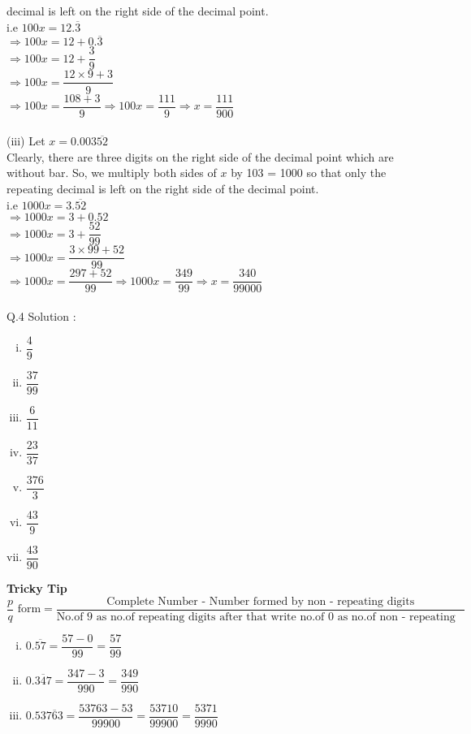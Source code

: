 decimal is left on the right
side of the decimal point.\\
i.e $100x = 12.\overline{3}$\\
$\Rightarrow 100x = 12+0.\overline{3}$\\  
$\Rightarrow 100x = 12+\dfrac{3}{9}$\\
$\Rightarrow 100x = \dfrac{12\times9+3}{9}$\\
$\Rightarrow 100x = \dfrac{108+3}{9} \Rightarrow 100x = \dfrac{111}{9}
\Rightarrow x = \dfrac{111}{900}$\\\\
(iii) Let $x = 0.003\overline{52}$\\
Clearly, there are three digits on the right side of the decimal point
which are without bar. So,
we multiply both sides of $x$ by 103 = 1000 so that only the repeating
decimal is left on the
right side of the decimal point.\\
i.e $1000x = 3.\overline{52}$\\
$\Rightarrow  1000x =  3+0.52$\\
$\Rightarrow  1000x = 3+\dfrac{52}{99}$\\
$\Rightarrow  1000x = \dfrac{3\times99+52}{99}$\\
$\Rightarrow  1000x = \dfrac{297+52}{99} \Rightarrow  1000x =
\dfrac{349}{99} \Rightarrow  x = \dfrac{340}{99000}$\\\\
Q.4 Solution :
\begin{multicols}{6}
\begin{enumerate}[(i)]
\item $\dfrac{4}{9}$
\item  $\dfrac{37}{99}$
\item $\dfrac{6}{11}$
\item $\dfrac{23}{37}$
\item $\dfrac{376}{3}$
\item $\dfrac{43}{9}$
\item $\dfrac{43}{90}$
\end{enumerate}
\end{multicols}
\begin{tcolorbox}
\begin{center}
\textbf{\Large Tricky Tip}\\
\vspace{3mm}
$\dfrac{p}{q} \text{  form} = \dfrac{\text{Complete Number - Number formed by non -
repeating digits}}{\text{No.of 9 as no.of repeating digits after that write
no.of 0 as no.of non - repeating digits}}$
\begin{enumerate}[(i)]
\item  $0.\overline{57} = \dfrac{57-0}{99} = \dfrac{57}{99}$
\item $0.\overline{347} = \dfrac{347-3}{990} = \dfrac{349}{990}$
\item $0.53\overline{763} = \dfrac{53763-53}{99900} =
\dfrac{53710}{99900} = \dfrac{5371}{9990}$
\end{enumerate}
\end{center}
\end{tcolorbox}
